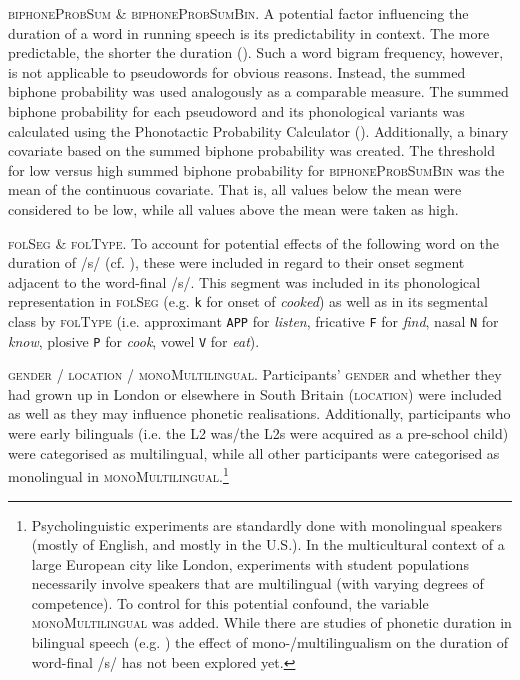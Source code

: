 \textsc{biphoneProbSum} \& \textsc{biphoneProbSumBin}. A potential factor influencing the duration of a word in running speech is its predictability in context. The more predictable, the shorter the duration (\cite{Pluymaekers2005a, Bell2009, Torreira2009}). Such a word bigram frequency, however, is not applicable to pseudowords for obvious reasons. Instead, the summed biphone probability was used analogously as a comparable measure. The summed biphone probability for each pseudoword and its phonological variants was calculated using the Phonotactic Probability Calculator (\cite{Vitevitch2004}). Additionally, a binary covariate based on the summed biphone probability was created. The threshold for low versus high summed biphone probability for \textsc{biphoneProbSumBin} was the mean of the continuous covariate. That is, all values below the mean were considered to be low, while all values above the mean were taken as high.

\textsc{folSeg} \& \textsc{folType}. To account for potential effects of the following word on the duration of /s/ (cf. \cite{Klatt1976, Umeda1977}), these were included in regard to their onset segment adjacent to the word-final /s/. This segment was included in its phonological representation in \textsc{folSeg} (e.g. \texttt{k} for onset of \textit{cooked}) as well as in its segmental class by \textsc{folType} (i.e. approximant \texttt{APP} for \textit{listen}, fricative \texttt{F} for \textit{find}, nasal \texttt{N} for \textit{know}, plosive \texttt{P} for \textit{cook}, vowel \texttt{V} for \textit{eat}).

\textsc{gender} / \textsc{location} / \textsc{monoMultilingual}. Participants’ \textsc{gender} and whether they had grown up in London or elsewhere in South Britain (\textsc{location}) were included as well as they may influence phonetic realisations. Additionally, participants who were early bilinguals (i.e. the L2 was/the L2s were acquired as a pre-school child) were categorised as multilingual, while all other participants were categorised as monolingual in \textsc{monoMultilingual}.\footnote{Psycholinguistic experiments are standardly done with monolingual speakers (mostly of English, and mostly in the U.S.). In the multicultural context of a large European city like London, experiments with student populations necessarily involve speakers that are multilingual (with varying degrees of competence). To control for this potential confound, the variable \textsc{monoMultilingual} was added. While there are studies of phonetic duration in bilingual speech (e.g. \cite{Mack1982, Lee2012}) the effect of mono-/multilingualism on the duration of word-final /s/ has not been explored yet.}

